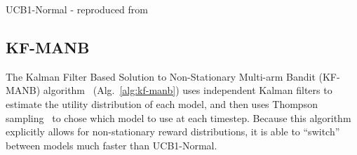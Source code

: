 \begin{algorithm}[t]
    \caption{UCB1-Normal - reproduced from~\cite{Auer2002}}
    \label{alg:ucb1normal}
    \begin{algorithmic}
            \vspace{-11pt}
        \EndFor
    \end{algorithmic}
\end{algorithm}


\subsection{KF-MANB}
The Kalman Filter Based Solution to Non-Stationary Multi-arm Bandit (KF-MANB) algorithm~\cite{Granmo2010} (Alg.~\ref{alg:kf-manb}) uses independent Kalman filters to estimate the utility distribution of each model, and then uses Thompson sampling~\cite{Agrawal2012} to chose which model to use at each timestep. Because this algorithm explicitly allows for non-stationary reward distributions, it is able to ``switch'' between models much faster than UCB1-Normal.

